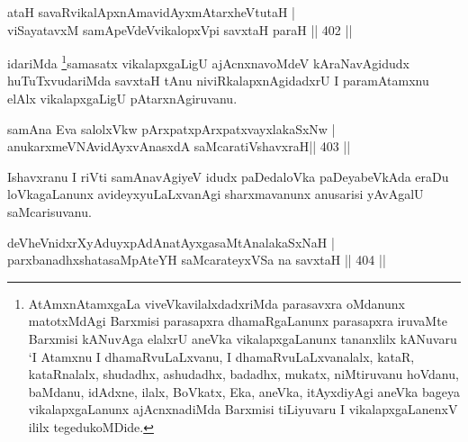 
\begin{shl}
ataH savaRvikalApxnAmavidAyxmAtarxheVtutaH | \\
viSayatavxM samApeVdeV\s vikalopxV\s pi savxtaH paraH \hfill||  402 ||  
\end{shl}

\begin{artha}
idariMda \footnote{AtAmxnAtamxgaLa viveVkavilalxdadxriMda parasavxra oMdanunx matotxMdAgi Barxmisi parasapxra dhamaRgaLanunx parasapxra iruvaMte Barxmisi kANuvAga elalxrU aneVka vikalapxgaLanunx tananxlilx kANuvaru `I Atamxnu I dhamaRvuLaLxvanu, I dhamaRvuLaLxvanalalx, kataR, kataRnalalx, shudadhx, ashudadhx, badadhx, mukatx, niMtiruvanu hoVdanu, baMdanu, idAdxne, ilalx, BoVkatx, Eka, aneVka, itAyxdiyAgi aneVka bageya vikalapxgaLanunx ajAcnxnadiMda Barxmisi tiLiyuvaru I vikalapxgaLanenxV ililx tegedukoMDide.}samasatx vikalapxgaLigU ajAcnxnavoMdeV kAraNavAgidudx huTuTxvudariMda savxtaH tAnu niviRkalapxnAgidadxrU I paramAtamxnu elAlx vikalapxgaLigU pAtarxnAgiruvanu.
\end{artha}


\begin{shl}
samAna Eva salolxVkw pArxpatxpArxpatxvayxlakaSxNw | \\
anukarxmeVNAvidAyxvAnasxdA saMcaratiVshavxraH\footnotemark[2] \hfill||  403 ||  
\end{shl}

\begin{artha}
Ishavxranu I riVti samAnavAgiyeV idudx paDedaloVka paDeyabeVkAda eraDu loVkagaLanunx avideyxyuLaLxvanAgi sharxmavanunx anusarisi yAvAgalU saMcarisuvanu.
\end{artha}


\begin{shl}
deVheVnidxrXyAduyxpAdAnatAyxgasaMtAnalakaSxNaH | \\
parxbanadhxshatasaMpAteYH saMcarateyxVSa na savxtaH \hfill||  404 ||  
\end{shl}	


